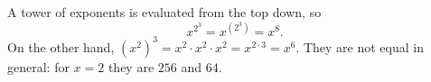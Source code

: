 A tower of exponents is evaluated from the top down, so
\[x^{2^3}=x^{(2^3)}=\boxed{x^8}.\]
On the other hand, $(x^2)^3=x^2\cdot x^2\cdot x^2=x^{2\cdot3}=\boxed{x^6}$. They are not equal in general: for $x=2$ they are $256$ and $64$.
